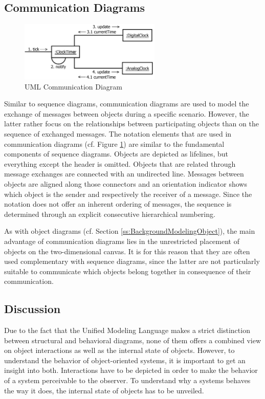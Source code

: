 \subsection{Communication Diagrams}
\label{ss:BackgroundModelingCommunication}

\begin{figure}
	\centering
	\includegraphics[width=0.6\textwidth]{../images/02-Communication}
	\caption[TOC Caption]{UML Communication Diagram}
	\label{fig:BackgroundModelingCommunication}
\end{figure}

Similar to sequence diagrams, communication diagrams \cite{rumbaugh_unified_2010} are used to model the exchange of messages between objects during a specific scenario.
However, the latter rather focus on the relationships between participating objects than on the sequence of exchanged messages.
The notation elements that are used in communication diagrams (cf. Figure \ref{fig:BackgroundModelingCommunication}) are similar to the fundamental components of sequence diagrams.
Objects are depicted as lifelines, but everything except the header is omitted.
Objects that are related through message exchanges are connected with an undirected line.
Messages between objects are aligned along those connectors and an orientation indicator shows which object is the sender and respectively the receiver of a message.
Since the notation does not offer an inherent ordering of messages, the sequence is determined through an explicit consecutive hierarchical numbering.

As with object diagrams (cf. Section \ref{ss:BackgroundModelingObject}), the main advantage of communication diagrams lies in the unrestricted placement of objects on the two-dimensional canvas.
It is for this reason that they are often used complementary with sequence diagrams, since the latter are not particularly suitable to communicate which objects belong together in consequence of their communication.

\subsection{Discussion}
Due to the fact that the Unified Modeling Language makes a strict distinction between structural and behavioral diagrams, none of them offers a combined view on object interactions as well as the internal state of objects.
However, to understand the behavior of object-oriented systems, it is important to get an insight into both.
Interactions have to be depicted in order to make the behavior of a system perceivable to the observer.
To understand why a systems behaves the way it does, the internal state of objects has to be unveiled.

